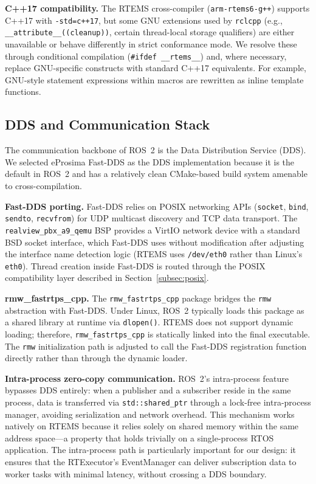 \textbf{C++17 compatibility.}
The RTEMS cross-compiler (\texttt{arm-rtems6-g++}) supports C++17 with \texttt{-std=c++17}, but some GNU extensions used by \texttt{rclcpp} (e.g., \texttt{\_\_attribute\_\_((cleanup))}, certain thread-local storage qualifiers) are either unavailable or behave differently in strict conformance mode.
We resolve these through conditional compilation (\texttt{\#ifdef \_\_rtems\_\_}) and, where necessary, replace GNU-specific constructs with standard C++17 equivalents.
For example, GNU-style statement expressions within macros are rewritten as inline template functions.

\subsection{DDS and Communication Stack}
\label{subsec:dds}

The communication backbone of ROS~2 is the Data Distribution Service (DDS).
We selected eProsima Fast-DDS as the DDS implementation because it is the default in ROS~2 and has a relatively clean CMake-based build system amenable to cross-compilation.

\textbf{Fast-DDS porting.}
Fast-DDS relies on POSIX networking APIs (\texttt{socket}, \texttt{bind}, \texttt{sendto}, \texttt{recvfrom}) for UDP multicast discovery and TCP data transport.
The \texttt{realview\_pbx\_a9\_qemu} BSP provides a VirtIO network device with a standard BSD socket interface, which Fast-DDS uses without modification after adjusting the interface name detection logic (RTEMS uses \texttt{/dev/eth0} rather than Linux's \texttt{eth0}).
Thread creation inside Fast-DDS is routed through the POSIX compatibility layer described in Section~\ref{subsec:posix}.

\textbf{rmw\_fastrtps\_cpp.}
The \texttt{rmw\_fastrtps\_cpp} package bridges the \texttt{rmw} abstraction with Fast-DDS.
Under Linux, ROS~2 typically loads this package as a shared library at runtime via \texttt{dlopen()}.
RTEMS does not support dynamic loading; therefore, \texttt{rmw\_fastrtps\_cpp} is statically linked into the final executable.
The \texttt{rmw} initialization path is adjusted to call the Fast-DDS registration function directly rather than through the dynamic loader.

\textbf{Intra-process zero-copy communication.}
ROS~2's intra-process feature bypasses DDS entirely: when a publisher and a subscriber reside in the same process, data is transferred via \texttt{std::shared\_ptr} through a lock-free intra-process manager, avoiding serialization and network overhead.
This mechanism works natively on RTEMS because it relies solely on shared memory within the same address space---a property that holds trivially on a single-process RTOS application.
The intra-process path is particularly important for our design: it ensures that the RTExecutor's EventManager can deliver subscription data to worker tasks with minimal latency, without crossing a DDS boundary.

